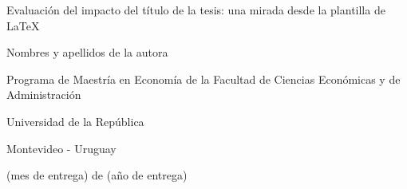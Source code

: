 \begin{center}

\noindent{}

\vspace{1cm}

\Huge Evaluación del impacto del título de la tesis: una mirada desde la plantilla de \LaTeX

\vspace{3cm}

\Large Nombres y apellidos de la autora

\vspace{5cm}

\normalsize Programa de Maestría en Economía de la Facultad de Ciencias Económicas y de Administración

Universidad de la República

\vspace{2cm}

Montevideo - Uruguay

\vspace{0.5cm}

(mes de entrega) de (año de entrega)
    
\end{center}

\newpage